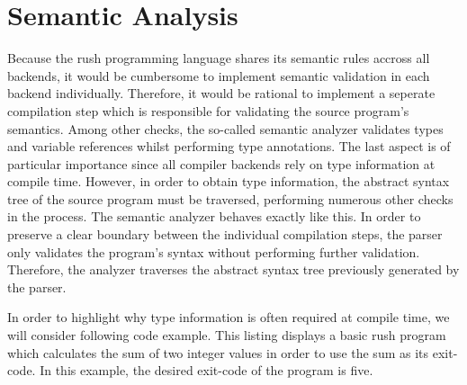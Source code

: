 \chapter{Semantic Analysis}

Because the rush programming language shares its semantic rules accross all
backends, it would be cumbersome to implement semantic validation in each
backend individually. Therefore, it would be rational to implement a seperate
compilation step which is responsible for validating the source program's
semantics. Among other checks, the so-called semantic analyzer validates types
and variable references whilst performing type annotations. The last aspect is
of particular importance since all compiler backends rely on type information at
compile time. However, in order to obtain type information, the abstract syntax
tree of the source program must be traversed, performing numerous other checks
in the process. The semantic analyzer behaves exactly like this. In order to
preserve a clear boundary between the individual compilation steps, the parser
only validates the program's syntax without performing further validation.
Therefore, the analyzer traverses the abstract syntax tree previously generated
by the parser.

In order to highlight why type information is often required at compile time, we
will consider following code example. This listing displays a basic rush program
which calculates the sum of two integer values in order to use the sum as its
exit-code. In this example, the desired exit-code of the program is five.


